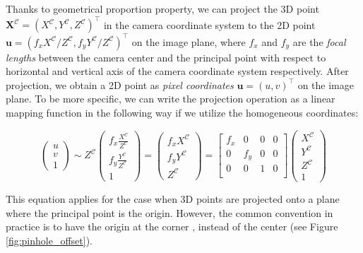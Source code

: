 \documentclass[a4paper]{report}
\numberwithin{figure}{section}
\begin{document}
Thanks to geometrical proportion property, we can project the 3D point 
$\mathbf{X^{\mathcal{C}}}=(X^{\mathcal{C}}, Y^{\mathcal{C}}, 
Z^{\mathcal{C}})^\top$ in the 
camera 
coordinate system 
to 
the 2D 
point $\mathbf{u} = (f_xX^{\mathcal{C}}/Z^{\mathcal{C}}, 
f_yY^{\mathcal{C}}/Z^{\mathcal{C}})^\top$ on the 
image 
plane, where 
$f_x$ and $f_y$ are the \textit{focal lengths} between the camera center and 
the principal point with respect to horizontal and vertical axis of the camera 
coordinate system respectively.  After projection, we obtain a 2D point  
as \textit{pixel coordinates} $\mathbf{u}=(u,v)^\top$ on the image 
plane.  To 
be more specific, we can write the projection operation as a linear mapping 
function in the following way if we utilize the homogeneous coordinates:

\begin{equation}
  \begin{pmatrix}
    u\\
    v\\
    1
  \end{pmatrix}
  \sim
  Z^{\mathcal{C}}
  \begin{pmatrix}
    f_x\frac{X^{\mathcal{C}}}{Z^{\mathcal{C}}}\\
    f_y\frac{Y^{\mathcal{C}}}{Z^{\mathcal{C}}}\\
    1
  \end{pmatrix}
  =
  \begin{pmatrix}
    f_xX^{\mathcal{C}}\\
    f_yY^{\mathcal{C}}\\
    Z^{\mathcal{C}}
  \end{pmatrix}
  =
  \begin{bmatrix}
    f_x & 0 & 0 & 0\\
    0 & f_y & 0 & 0\\
    0 & 0 & 1 & 0\\
  \end{bmatrix}
  \begin{pmatrix}
    X^{\mathcal{C}}\\
    Y^{\mathcal{C}}\\
    Z^{\mathcal{C}}\\
    1
  \end{pmatrix}
\end{equation} \label{eq:proj_func_w_f}

This equation applies for the case when 3D points are projected onto a plane 
where the principal point is the origin.  However, the common convention in 
practice is to have the origin at the corner \parencite{RichardHartley2003}, 
instead of the center (see Figure \ref{fig:pinhole_offset}).
\end{document}
